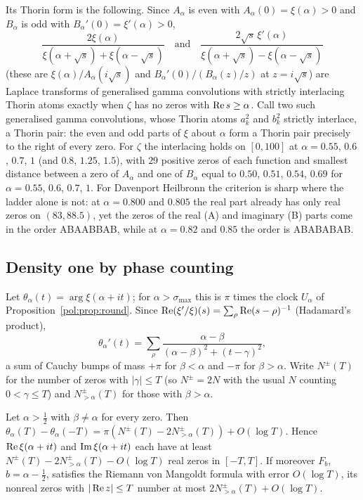 Its Thorin form is the following. Since $A_\alpha$ is even with $A_\alpha(0)=\xi(\alpha)>0$ and $B_\alpha$ is odd with $B_\alpha'(0)=\xi'(\alpha)>0$,
\[
\frac{2\xi(\alpha)}{\xi(\alpha+\sqrt s)+\xi(\alpha-\sqrt s)}\quad\text{and}\quad\frac{2\sqrt s\,\xi'(\alpha)}{\xi(\alpha+\sqrt s)-\xi(\alpha-\sqrt s)}
\]
(these are $\xi(\alpha)/A_\alpha(i\sqrt s)$ and $B_\alpha'(0)/(B_\alpha(z)/z)$ at $z=i\sqrt s$) are Laplace transforms of generalised gamma convolutions with strictly interlacing Thorin atoms exactly when $\zeta$ has no zeros with $\operatorname{Re} s\ge\alpha$. Call two such generalised gamma convolutions, whose Thorin atoms $a_k^2$ and $b_k^2$ strictly interlace, a Thorin pair: the even and odd parts of $\xi$ about $\alpha$ form a Thorin pair precisely to the right of every zero. For $\zeta$ the interlacing holds on $[0,100]$ at $\alpha=0.55$, $0.6$, $0.7$, $1$ (and $0.8$, $1.25$, $1.5$), with $29$ positive zeros of each function and smallest distance between a zero of $A_\alpha$ and one of $B_\alpha$ equal to $0.50$, $0.51$, $0.54$, $0.69$ for $\alpha=0.55$, $0.6$, $0.7$, $1$. For Davenport Heilbronn the criterion is sharp where the ladder alone is not: at $\alpha=0.800$ and $0.805$ the real part already has only real zeros on $(83,88.5)$, yet the zeros of the real (A) and imaginary (B) parts come in the order ABAABBAB, while at $\alpha=0.82$ and $0.85$ the order is ABABABAB.

\subsection{Density one by phase counting}\label{mi:sec:density}

Let $\theta_\alpha(t)=\arg\xi(\alpha+it)$; for $\alpha>\sigma_{\max}$ this is $\pi$ times the clock $U_\alpha$ of Proposition~\ref{pol:prop:round}. Since $\operatorname{Re}(\xi'/\xi)(s)=\sum_\rho\operatorname{Re}(s-\rho)^{-1}$ (Hadamard's product),
\[
\theta_\alpha'(t)=\sum_\rho\frac{\alpha-\beta}{(\alpha-\beta)^2+(t-\gamma)^2},
\]
a sum of Cauchy bumps of mass $+\pi$ for $\beta<\alpha$ and $-\pi$ for $\beta>\alpha$. Write $N^\pm(T)$ for the number of zeros with $|\gamma|\le T$ (so $N^\pm=2N$ with the usual $N$ counting $0<\gamma\le T$) and $N^\pm_{>\alpha}(T)$ for those with $\beta>\alpha$.

\begin{theorem}\label{mi:thm:density}
Let $\alpha>\frac12$ with $\beta\ne\alpha$ for every zero. Then $\theta_\alpha(T)-\theta_\alpha(-T)=\pi(N^\pm(T)-2N^\pm_{>\alpha}(T))+O(\log T)$. Hence $\operatorname{Re}\xi(\alpha+it)$ and $\operatorname{Im}\xi(\alpha+it)$ each have at least $N^\pm(T)-2N^\pm_{>\alpha}(T)-O(\log T)$ real zeros in $[-T,T]$. If moreover $F_b$, $b=\alpha-\frac12$, satisfies the Riemann von Mangoldt formula with error $O(\log T)$, its nonreal zeros with $|\operatorname{Re} z|\le T$ number at most $2N^\pm_{>\alpha}(T)+O(\log T)$.
\end{theorem}

